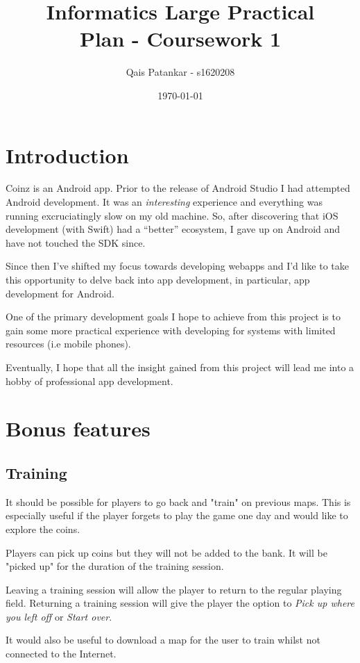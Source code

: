 \documentclass[a4paper]{article}
\title{Informatics Large Practical \\ \large{Plan - Coursework 1}}
\author{Qais Patankar - s1620208}
\date{\today}
\begin{document}
\maketitle

\section{Introduction}
\label{sec:introduction}

Coinz is an Android app. Prior to the release of Android Studio I had attempted Android development. It was an \textit{interesting} experience and everything was running excruciatingly slow on my old machine. So, after discovering that iOS development (with Swift) had a ``better'' ecosystem, I gave up on Android and have not touched the SDK since.

Since then I've shifted my focus towards developing webapps and I'd like to take this opportunity to delve back into app development, in particular, app development for Android.

One of the primary development goals I hope to achieve from this project is to gain some more practical experience with developing for systems with limited resources (i.e mobile phones).

Eventually, I hope that all the insight gained from this project will lead me into a hobby of professional app development.

\section{Bonus features}
\label{sec:bonus}

\subsection{Training}
It should be possible for players to go back and "train" on previous maps. This is especially useful if the player forgets to play the game one day and would like to explore the coins.

Players can pick up coins but they will not be added to the bank. It will be "picked up" for the duration of the training session.

Leaving a training session will allow the player to return to the regular playing field. Returning a training session will give the player the option to \emph{Pick up where you left off} or \emph{Start over}.

It would also be useful to download a map for the user to train whilst not connected to the Internet.
\end{document}
